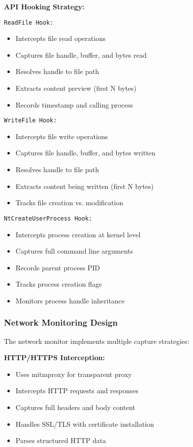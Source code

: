 \textbf{API Hooking Strategy:}

\texttt{ReadFile Hook:}
\begin{itemize}
    \item Intercepts file read operations
    \item Captures file handle, buffer, and bytes read
    \item Resolves handle to file path
    \item Extracts content preview (first N bytes)
    \item Records timestamp and calling process
\end{itemize}

\texttt{WriteFile Hook:}
\begin{itemize}
    \item Intercepts file write operations
    \item Captures file handle, buffer, and bytes written
    \item Resolves handle to file path
    \item Extracts content being written (first N bytes)
    \item Tracks file creation vs. modification
\end{itemize}

\texttt{NtCreateUserProcess Hook:}
\begin{itemize}
    \item Intercepts process creation at kernel level
    \item Captures full command line arguments
    \item Records parent process PID
    \item Tracks process creation flags
    \item Monitors process handle inheritance
\end{itemize}

\subsubsection{Network Monitoring Design}

The network monitor implements multiple capture strategies:

\textbf{HTTP/HTTPS Interception:}
\begin{itemize}
    \item Uses mitmproxy for transparent proxy
    \item Intercepts HTTP requests and responses
    \item Captures full headers and body content
    \item Handles SSL/TLS with certificate installation
    \item Parses structured HTTP data
\end{itemize}

